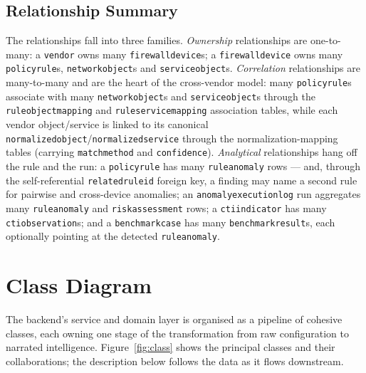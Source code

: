 \documentclass[12pt,a4paper]{report}
\renewcommand{\_}{\textunderscore\allowbreak}
\begin{document}
\subsection{Relationship Summary}

The relationships fall into three families. \textit{Ownership} relationships are one-to-many: a \texttt{vendor} owns many \texttt{firewall\_device}s; a \texttt{firewall\_device} owns many \texttt{policy\_rule}s, \texttt{network\_object}s and \texttt{service\_object}s. \textit{Correlation} relationships are many-to-many and are the heart of the cross-vendor model: many \texttt{policy\_rule}s associate with many \texttt{network\_object}s and \texttt{service\_object}s through the \texttt{rule\_object\_mapping} and \texttt{rule\_service\_mapping} association tables, while each vendor object/service is linked to its canonical \texttt{normalized\_object}/\texttt{normalized\_service} through the normalization-mapping tables (carrying \texttt{match\_method} and \texttt{confidence}). \textit{Analytical} relationships hang off the rule and the run: a \texttt{policy\_rule} has many \texttt{rule\_anomaly} rows --- and, through the self-referential \texttt{related\_rule\_id} foreign key, a finding may name a second rule for pairwise and cross-device anomalies; an \texttt{anomaly\_execution\_log} run aggregates many \texttt{rule\_anomaly} and \texttt{risk\_assessment} rows; a \texttt{cti\_indicator} has many \texttt{cti\_observation}s; and a \texttt{benchmark\_case} has many \texttt{benchmark\_result}s, each optionally pointing at the detected \texttt{rule\_anomaly}.

\section{Class Diagram}
\label{sec:ch3-class}

The backend's service and domain layer is organised as a pipeline of cohesive classes, each owning one stage of the transformation from raw configuration to narrated intelligence. Figure~\ref{fig:class} shows the principal classes and their collaborations; the description below follows the data as it flows downstream.
\end{document}
